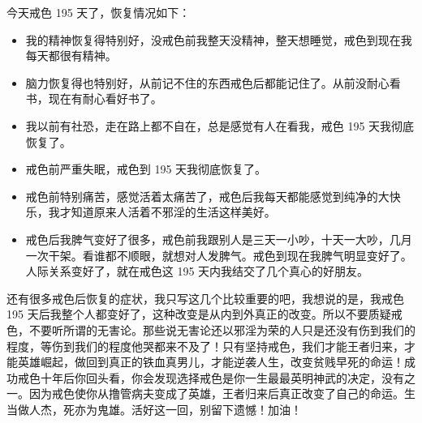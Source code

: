 \begin{case}
    今天戒色 195 天了，恢复情况如下：\begin{itemize}
        \item 我的精神恢复得特别好，没戒色前我整天没精神，整天想睡觉，戒色到现在我每天都很有精神。
        \item 脑力恢复得也特别好，从前记不住的东西戒色后都能记住了。从前没耐心看书，现在有耐心看好书了。
        \item 我以前有社恐，走在路上都不自在，总是感觉有人在看我，戒色 195 天我彻底恢复了。
        \item 戒色前严重失眠，戒色到 195 天我彻底恢复了。
        \item 戒色前特别痛苦，感觉活着太痛苦了，戒色后我每天都能感觉到纯净的大快乐，我才知道原来人活着不邪淫的生活这样美好。
        \item 戒色后我脾气变好了很多，戒色前我跟别人是三天一小吵，十天一大吵，几月一次干架。看谁都不顺眼，就想对人发脾气。戒色到现在我脾气明显变好了。人际关系变好了，就在戒色这 195 天内我结交了几个真心的好朋友。
    \end{itemize} 还有很多戒色后恢复的症状，我只写这几个比较重要的吧，我想说的是，我戒色 195 天后我整个人都变好了，这种改变是从内到外真正的改变。所以不要质疑戒色，不要听所谓的无害论。那些说无害论还以邪淫为荣的人只是还没有伤到我们的程度，等伤到我们的程度他哭都来不及了！只有坚持戒色，我们才能王者归来，才能英雄崛起，做回到真正的铁血真男儿，才能逆袭人生，改变贫贱早死的命运！成功戒色十年后你回头看，你会发现选择戒色是你一生最最英明神武的决定，没有之一。因为戒色使你从撸管病夫变成了英雄，王者归来后真正改变了自己的命运。生当做人杰，死亦为鬼雄。活好这一回，别留下遗憾！加油！

\end{case}
